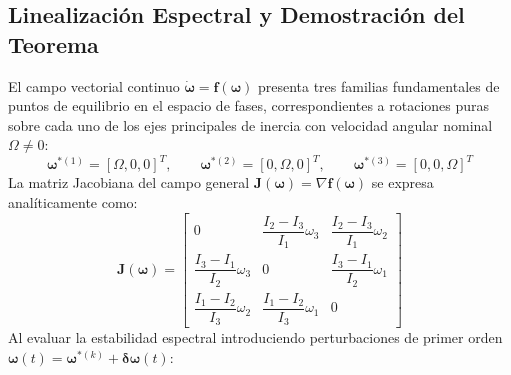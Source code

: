\documentclass[11pt, a4paper]{article}
\begin{document}
\subsection{Linealización Espectral y Demostración del Teorema}
El campo vectorial continuo $\dot{\boldsymbol{\omega}} = \mathbf{f}(\boldsymbol{\omega})$ 
presenta tres familias fundamentales de puntos de equilibrio en el espacio de fases, 
correspondientes a rotaciones puras sobre cada uno de los ejes principales de 
inercia con velocidad angular nominal $\Omega \neq 0$:
\begin{equation}
\boldsymbol{\omega}^{*(1)} = [\Omega, 0, 0]^T, \qquad \boldsymbol{\omega}^{*(2)} = [0, \Omega, 0]^T, \qquad \boldsymbol{\omega}^{*(3)} = [0, 0, \Omega]^T
\end{equation}
La matriz Jacobiana del campo general $\mathbf{J}(\boldsymbol{\omega}) = \nabla \mathbf{f}(\boldsymbol{\omega})$ se expresa analíticamente como:
\begin{equation}
\mathbf{J}(\boldsymbol{\omega}) = \begin{bmatrix}
0 & \dfrac{I_2 - I_3}{I_1}\omega_3 & \dfrac{I_2 - I_3}{I_1}\omega_2 \\[0.7em]
\dfrac{I_3 - I_1}{I_2}\omega_3 & 0 & \dfrac{I_3 - I_1}{I_2}\omega_1 \\[0.7em]
\dfrac{I_1 - I_2}{I_3}\omega_2 & \dfrac{I_1 - I_2}{I_3}\omega_1 & 0
\end{bmatrix}
\end{equation}
Al evaluar la estabilidad espectral introduciendo perturbaciones de primer orden $\boldsymbol{\omega}(t) = \boldsymbol{\omega}^{*(k)} + \boldsymbol{\delta\omega}(t)$:
\end{document}
